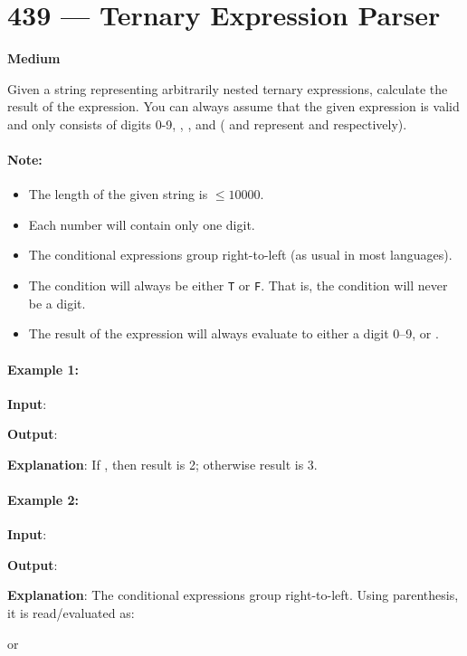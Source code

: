 \section{439 --- Ternary Expression Parser}

\textbf{Medium}

Given a string representing arbitrarily nested ternary expressions, calculate the result of the expression. You can always assume that the given expression is valid and only consists of digits 0-9, , \fcj{:},  and  ( and  represent  and  respectively).

\paragraph{Note:}

\begin{itemize}
\item The length of the given string is $\leq 10000$.
\item Each number will contain only one digit.
\item The conditional expressions group right-to-left (as usual in most languages).
\item The condition will always be either \texttt{T} or \texttt{F}. That is, the condition will never be a digit.
\item The result of the expression will always evaluate to either a digit 0--9,  or .
\end{itemize}
 

\paragraph{Example 1:}

\begin{flushleft}
\textbf{Input}: 

\textbf{Output}: 

\textbf{Explanation}: If , then result is 2; otherwise result is 3.
\end{flushleft}
 

\paragraph{Example 2:}

\begin{flushleft}
\textbf{Input}: 

\textbf{Output}: 

\textbf{Explanation}: The conditional expressions group right-to-left. Using parenthesis, it is read/evaluated as:


or 

\end{flushleft}


